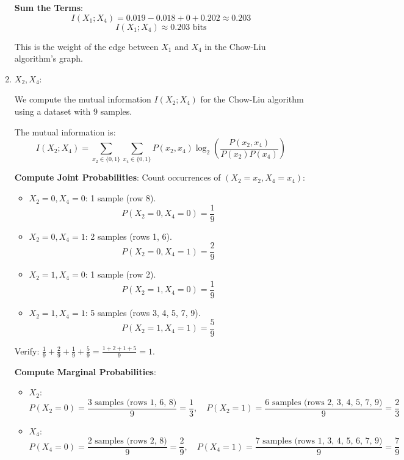 \documentclass[a3paper,12pt]{extarticle} %
\begin{document}
\begin{enumerate}
\textbf{Sum the Terms}:
\[
I(X_1; X_4) = 0.019 - 0.018 + 0 + 0.202 \approx 0.203
\]
\[
I(X_1; X_4) \approx 0.203 \text{ bits}
\]

This is the weight of the edge between \(X_1\) and \(X_4\) in the Chow-Liu algorithm's graph.
\item \(X_2, X_4\):

We compute the mutual information \(I(X_2; X_4)\) for the Chow-Liu algorithm using a dataset with 9 samples.

The mutual information is:
\[
I(X_2; X_4) = \sum_{x_2 \in \{0,1\}} \sum_{x_4 \in \{0,1\}} P(x_2, x_4) \log_2 \left( \frac{P(x_2, x_4)}{P(x_2)P(x_4)} \right)
\]

\textbf{Compute Joint Probabilities}: Count occurrences of \((X_2 = x_2, X_4 = x_4)\):
\begin{itemize}
    \item \(X_2 = 0, X_4 = 0\): 1 sample (row 8).
    \[
    P(X_2 = 0, X_4 = 0) = \frac{1}{9}
    \]
    \item \(X_2 = 0, X_4 = 1\): 2 samples (rows 1, 6).
    \[
    P(X_2 = 0, X_4 = 1) = \frac{2}{9}
    \]
    \item \(X_2 = 1, X_4 = 0\): 1 sample (row 2).
    \[
    P(X_2 = 1, X_4 = 0) = \frac{1}{9}
    \]
    \item \(X_2 = 1, X_4 = 1\): 5 samples (rows 3, 4, 5, 7, 9).
    \[
    P(X_2 = 1, X_4 = 1) = \frac{5}{9}
    \]
\end{itemize}
Verify: \(\frac{1}{9} + \frac{2}{9} + \frac{1}{9} + \frac{5}{9} = \frac{1 + 2 + 1 + 5}{9} = 1\).

\textbf{Compute Marginal Probabilities}:
\begin{itemize}
    \item \(X_2\):
    \[
    P(X_2 = 0) = \frac{\text{3 samples (rows 1, 6, 8)}}{9} = \frac{1}{3}, \quad P(X_2 = 1) = \frac{\text{6 samples (rows 2, 3, 4, 5, 7, 9)}}{9} = \frac{2}{3}
    \]
    \item \(X_4\):
    \[
    P(X_4 = 0) = \frac{\text{2 samples (rows 2, 8)}}{9} = \frac{2}{9}, \quad P(X_4 = 1) = \frac{\text{7 samples (rows 1, 3, 4, 5, 6, 7, 9)}}{9} = \frac{7}{9}
    \]
\end{itemize}


\end{enumerate}
\end{document}
